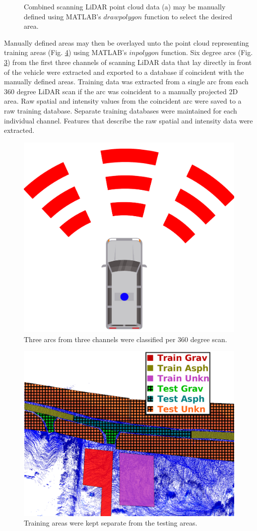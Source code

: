 \documentclass[numbered,pdftex]{ohio-etd}
\begin{document}
{{{{\begin{figure}[H]
\begin{subfigure}{0.45\textwidth}
						\caption[Selected Road area on Point Cloud]{}
						\label{fig:area_selected}
					\end{subfigure}
					\caption[Manual Area Selection Process]{Combined scanning LiDAR point cloud data (a) may be manually defined using MATLAB's $drawpolygon$ function to select the desired area. }
					\label{fig:Area_Selection_Process}
				\end{figure}
			
				{Manually defined areas may then be overlayed unto the point cloud representing training areas (Fig. \ref{fig:test_vs_train_areas}) using MATLAB's $inpolygon$ function. Six degree arcs (Fig. \ref{fig:area_example}) from the first three channels of scanning LiDAR data that lay directly in front of the vehicle were extracted and exported to a database if coincident with the manually defined areas. Training data was extracted from a single arc from each 360 degree LiDAR scan if the arc was coincident to a manually projected 2D area. Raw spatial and intensity values from the coincident arc were saved to a raw training database. Separate training databases were maintained for each individual channel. Features that describe the raw spatial and intensity data were extracted. }
				
				\begin{figure}[H]
					\centering
					\includegraphics[width=0.25\linewidth]{Defense_Images/area_example}
					\caption[Areas to Classify]{Three arcs from three channels were classified per 360 degree scan. }
					\label{fig:area_example}
				\end{figure}
				
				\begin{figure}[H]
					\centering
					\includegraphics[width=0.75\linewidth]{Defense_Images/test_vs_train_areas_hatch}
					\caption[Training vs Testing Areas]{Training areas were kept separate from the testing areas.}
					\label{fig:test_vs_train_areas}
				\end{figure}
			
}}}}
\end{document}
